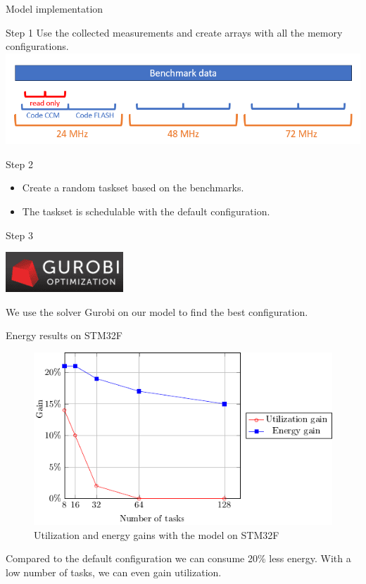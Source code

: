 \documentclass[
	11pt, %
]{beamer}
\begin{document}
\begin{frame}{Model implementation}
	\begin{block}{Step 1}
		Use the collected measurements and create arrays with all the memory configurations.\\
		\centering
		\includegraphics[scale=0.5]{images/data.png}
	\end{block}

	\begin{block}{Step 2}
		\begin{itemize}
			\item Create a random taskset based on the benchmarks.
			\item The taskset is schedulable with the default configuration.
		\end{itemize}
		
	\end{block}

	\begin{block}{Step 3}
		\begin{minipage}{0.25\textwidth}
			\includegraphics[scale=0.9]{images/gurobi.png}
		\end{minipage}
		\begin{minipage}{0.6\textwidth}
			We use the solver Gurobi on our model to find the best configuration. 
		\end{minipage}
	\end{block}
\end{frame}

\begin{frame}{Energy results on STM32F}
	\begin{figure}
		\includegraphics{data/model/poster.pdf}
		\caption{Utilization and energy gains with the model on STM32F}
	\end{figure}
	Compared to the default configuration we can consume 20\% less energy. 
	With a low number of tasks, we can even gain utilization.
\end{frame}
\end{document}
